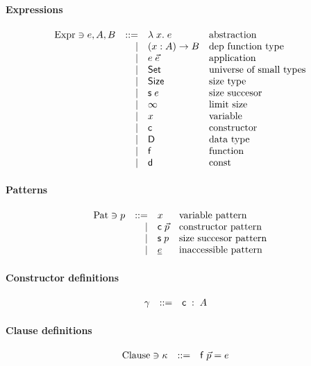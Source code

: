\paragraph*{Expressions}
\[
\begin{array}{lrll}
\mathrm{Expr} \ni e,A,B & ::= & \lambda\; x .\;{e} & \mbox{abstraction}\\
& \mid & ( x : A ) \rightarrow{B} & \mbox{dep function type}\\
& \mid & e \; \vec{e} & \mbox{application}\\
& \mid & \mathsf{Set} & \mbox{universe of small types}\\
& \mid & \mathsf{Size} & \mbox{size type} \\
& \mid & \mathsf{s}\; e  & \mbox{size succesor}\\ 
& \mid & \infty & \mbox{limit size}\\
& \mid & x & \mbox{variable}\\
& \mid & \mathsf{c} & \mbox{constructor}\\
& \mid & \mathsf{D} & \mbox{data type}\\
& \mid & \mathsf{f} & \mbox{function}\\
& \mid & \mathsf{d} & \mbox{const}
\end{array}
\]

\paragraph*{Patterns}
\[
\begin{array}{lrll}
\mathrm{Pat} \ni p & ::= & x & \mbox{variable pattern}\\
& \mid & \mathsf{c} \; \vec{p} & \mbox{constructor pattern}\\
& \mid & \mathsf{s}\; p & \mbox{size succesor pattern}\\
& \mid & \underline{e} & \mbox{inaccessible pattern}\\
\end{array}
\]

\paragraph*{Constructor definitions}
\[
\begin{array}{lrll}
\gamma &  ::= & \mathsf{c} \; : \; A & 
\end{array}
\]

\paragraph*{Clause definitions}
\[
\begin{array}{lrll}
\mathrm{Clause} \ni \kappa & ::= & \mathsf{f} \; \vec{p} = e & 
\end{array}
\]


